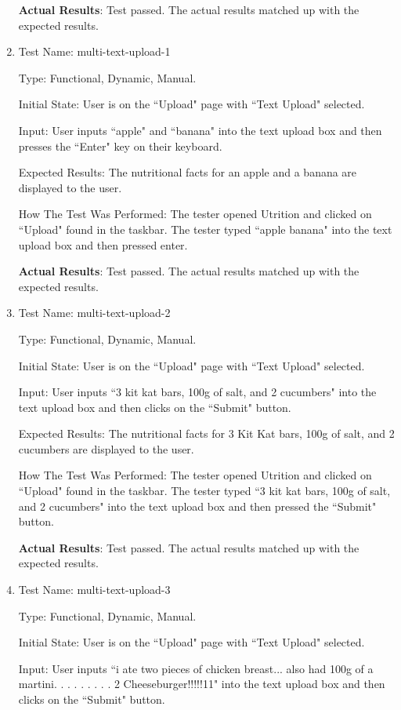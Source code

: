 \documentclass[12pt, titlepage]{article}
\begin{document}
\begin{enumerate}
		\textbf{Actual Results}: Test passed. The actual results matched up with the expected results.
		
		\item{Test Name: multi-text-upload-1}
		
		Type: Functional, Dynamic, Manual.
		
		Initial State: User is on the ``Upload" page with ``Text Upload" selected.
		
		Input: User inputs ``apple" and ``banana" into the text upload box and then presses the ``Enter" key on their keyboard.
		
		Expected Results: The nutritional facts for an apple and a banana are displayed to the user.
		
		How The Test Was Performed: The tester opened Utrition and clicked on ``Upload" found in the taskbar. The tester typed ``apple banana" into the text upload box and then pressed enter. 
		
		\textbf{Actual Results}: Test passed. The actual results matched up with the expected results.
		
		\item{Test Name: multi-text-upload-2}
		
		Type: Functional, Dynamic, Manual.
	
		Initial State: User is on the ``Upload" page with ``Text Upload" selected.
		
		Input: User inputs ``3 kit kat bars, 100g of salt, and 2 cucumbers" into the text upload box and then clicks on the ``Submit" button.
		
		Expected Results: The nutritional facts for 3 Kit Kat bars, 100g of salt, and 2 cucumbers are displayed to the user.
		
		How The Test Was Performed: The tester opened Utrition and clicked on ``Upload" found in the taskbar. The tester typed ``3 kit kat bars, 100g of salt, and 2 cucumbers" into the text upload box and then pressed the ``Submit" button.
		
		\textbf{Actual Results}: Test passed. The actual results matched up with the expected results.
		
		\item{Test Name: multi-text-upload-3}
		
		Type: Functional, Dynamic, Manual.
		
		Initial State: User is on the ``Upload" page with ``Text Upload" selected.
		
		Input: User inputs ``i ate two pieces of chicken breast... also had 100g of a martini. . . . . . . . . 2 Cheeseburger!!!!!11" into the text upload box and then clicks on the ``Submit" button.
		

\end{enumerate}
\end{document}
